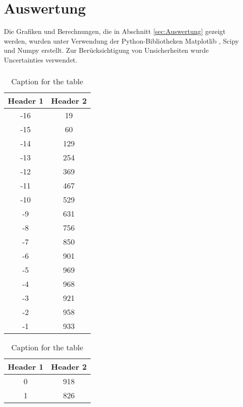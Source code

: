 \section{Auswertung}
\label{sec:Auswertung}
Die Grafiken und Berechnungen, die in Abschnitt \autoref{sec:Auswertung} gezeigt werden, wurden unter Verwendung der Python-Bibliotheken Matplotlib \cite{matplotlib}, Scipy \cite{scipy} und Numpy \cite{numpy} erstellt. 
Zur Berücksichtigung von Unsicherheiten wurde Uncertainties \cite{uncertainties} verwendet.

\subsubsection{}

\begin{table}[htbp]
  \centering
  \caption{Caption for the table}
  \begin{minipage}[t]{0.45\linewidth}
    \centering
    \begin{tabular}{c|c}
      \hline
      \textbf{Header 1} & \textbf{Header 2} \\
      \hline
      -16 & 19\\
      -15 & 60\\
      -14 & 129\\
      -13 & 254\\
      -12 & 369\\
      -11 & 467\\
      -10 & 529\\
      -9 & 631\\
      -8 & 756\\
      -7 & 850\\
      -6 & 901\\
      -5 & 969\\
      -4 & 968\\
      -3 & 921\\
      -2 & 958\\
      -1 & 933\\
      \hline
    \end{tabular}
  \end{minipage}
  \begin{minipage}[t]{0.45\linewidth}
    \centering
    \begin{tabular}{c|c}
      \hline
      \textbf{Header 1} & \textbf{Header 2} \\
      \hline
      0 & 918\\
      1 & 826\\

\end{tabular}
\end{minipage}
\end{table}
